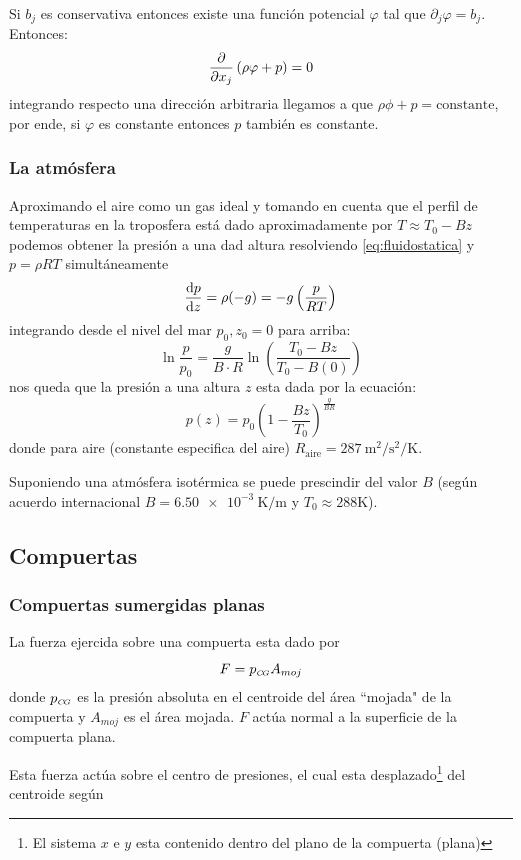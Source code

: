 Si $b_j$ es conservativa entonces existe una función potencial $\varphi$ tal que $\partial_j \varphi =b_j$. Entonces:
\[
\frac{\partial }{\partial x_j}\left(\rho \varphi +p \right) = 0
\]
integrando respecto una dirección arbitraria llegamos a que $\rho \phi+p=\textrm{constante}$, por ende, si $\varphi$ es constante entonces $p$ también es constante.

\subsubsection*{La atmósfera}
Aproximando el aire como un gas ideal y tomando en cuenta que el perfil de temperaturas en la troposfera está dado aproximadamente por $T\approx T_0 -B z$ podemos obtener la presión a una dad altura resolviendo \eqref{eq:fluidostatica} y $p=\rho R T$ simultáneamente
\[
 \frac{\textrm{d} p}{\textrm{d} z}=\rho( -g) =-g\left(\frac{p}{RT}  \right) 
\]
integrando desde el nivel del mar $p_0,z_0=0$ para arriba:
\[
\ln \frac{p}{p_0}= \frac{g}{B\cdot R} \ln\left(\frac{T_0-Bz}{T_0-B(0)}\right) 
\]
nos queda que la presión a una altura $z$ esta dada por la ecuación:
\[
p(z) = p_0 \left( 1-\frac{Bz}{T_0}\right)^{\frac{g}{BR}}
\]
donde para aire (constante especifica del aire) $R_{\textrm{aire}}=\SI{287}{\meter \squared \per \second \squared \per \kelvin}$.

Suponiendo una atmósfera isotérmica se puede prescindir del valor $B$ (según acuerdo internacional $B=\SI{6,50e-3}{\kelvin \per \meter}$ y  $T_0\approx 288 \si{\kelvin}$).

\newcommand{\CP}{{\mbox{\tiny $C\!P$}}}
\newcommand{\CG}{{\mbox{\tiny $C\!G$}}}
\subsection{Compuertas}
\subsubsection*{Compuertas sumergidas planas}
La fuerza ejercida sobre una compuerta esta dado por
\begin{equation}
F=p_{\CG}A_{moj}
\end{equation}
donde $p_{\CG}$ es la presión absoluta en el centroide del área ``mojada"{} de la compuerta y $A_{moj}$ es el área mojada. $F$ actúa normal a la superficie de la compuerta plana.

Esta fuerza actúa sobre el centro de presiones, el cual esta desplazado\footnote{El sistema $x$ e $y$ esta contenido dentro del plano de la compuerta (plana)} del centroide según

